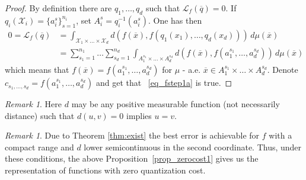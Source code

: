 \documentclass{amsart}
\theoremstyle{remark}
\newtheorem{remark}[theorem]{Remark}
\numberwithin{equation}{section}
\numberwithin{figure}{section}
\def\mX{\mathcal{X}}
\def\v{\overline}
\begin{document}
\begin{proof} By definition there are $q_1, \ldots, q_d$ such that $\mathcal{L}_{f}(\v q) = 0$.
	If $q_i(\mX_i) = \{a_i^{s}\}_{s=1}^{n_i}$, set $A_i^s = q_i^{-1}(a_i^s).$
	One has then
	\begin{align*}
	0 = \mathcal{L}_f(\v q) &= \int_{\mX_1 \times\ldots\times \mX_d} d(f(\v x),f(q_1(x_1),\ldots, q_d(x_d)))\,d\mu(\v x)\\
	&=  \sum_{s_1=1}^{n_1}\ldots\sum_{s_d=1}^{n_d} \int_{A_1^{s_1} \times\ldots \times A_d^{s_d}} d(f(\v x),f(a_1^{s_1},\ldots, a_d^{s_d}))\,d\mu(\v x)
	\end{align*}
	which means that $f(\v x) = f(a_1^{s_1}, \ldots, a_d^{s_d})$ for $\mu$ - a.e. $\v x \in A_1^{s_1}\times\ldots\times A_{d}^{s_d}$. Denote $c_{s_1, \ldots, s_d} = f(a_1^{s_1}, \ldots, a_d^{s_d})$ and get that ~\eqref{eq_fstep1a} is true.
	\end{proof}	

\begin{remark}
	Here $d$ may be any positive measurable function (not necessarily distance) such that $d(u,v) = 0$ implies $u=v$.
\end{remark}
	
\begin{remark}
	Due to Theorem \ref{thm:exist} the best error is achievable for $f$ with a compact range and $d$ lower semicontinuous in the second coordinate. Thus, under these conditions, the above Proposition~\ref{prop_zerocost1} gives us the representation of functions with zero quantization cost.
\end{remark}	
\end{document}
